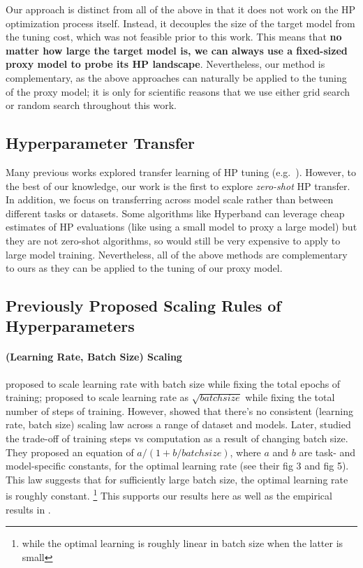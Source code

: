 \documentclass{article}
\theoremstyle{definition}
\begin{document}
Our approach is distinct from all of the above in that it does not work on the HP optimization process itself.
Instead, it decouples the size of the target model from the tuning cost, which was not feasible prior to this work.
This means that \textbf{no matter how large the target model is, we can always use a fixed-sized proxy model to probe its HP landscape}.
Nevertheless, our method is complementary, as the above approaches can naturally be applied to the tuning of the proxy model;
it is only for scientific reasons that we use either grid search or random search throughout this work.

\subsection{Hyperparameter Transfer}
\label{sec:hptransfer_related_works}
Many previous works explored transfer learning of HP tuning (e.g.\ \citep{yogatama_efficient_2014,perrone_scalable,stoll2021hyperparameter,hptransferadaptive}).
However, to the best of our knowledge, our work is the first to explore \emph{zero-shot} HP transfer.
In addition, we focus on transferring across model scale rather than between different tasks or datasets.
Some algorithms like Hyperband \citep{li_hyperband} can leverage cheap estimates of HP evaluations (like using a small model to proxy a large model) but they are not zero-shot algorithms, so would still be very expensive to apply to large model training.
Nevertheless, all of the above methods are complementary to ours as they can be applied to the tuning of our proxy model.

\subsection{Previously Proposed Scaling Rules of Hyperparameters}
\label{sec:previousscalings_appendix}
\paragraph{(Learning Rate, Batch Size) Scaling}
\citep{smith_dont_2017} proposed to scale learning rate with batch size while fixing the total epochs of training; \citep{hoffer_train_2017} proposed to scale learning rate as $\sqrt{batchsize}$ while fixing the total number of steps of training.
However, \citep{shallue_measuring_2018} showed that there's no consistent (learning rate, batch size) scaling law across a range of dataset and models.
Later, \citep{mccandlish_empirical_2018} studied the trade-off of training steps vs computation as a result of changing batch size.
They proposed an equation of $a/(1 + b / batchsize)$, where $a$ and $b$ are task- and model-specific constants, for the optimal learning rate (see their fig 3 and fig 5).
This law suggests that for sufficiently large batch size, the optimal learning rate is roughly constant.
\footnote{while the optimal learning is roughly linear in batch size when the latter is small}
This supports our results here as well as the empirical results in \citep[fig 8]{shallue_measuring_2018}.
\end{document}

